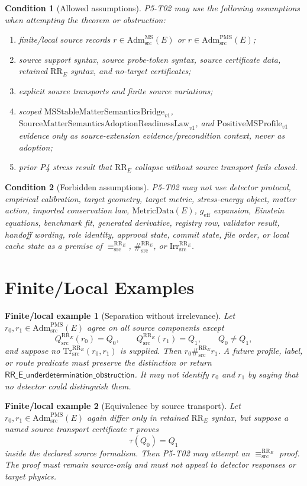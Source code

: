 \documentclass[11pt]{article}
\newcommand{\MSBridge}{\mathrm{MSStableMatterSemanticsBridge}_{v1}}
\newcommand{\SMSAR}{\mathrm{SourceMatterSemanticsAdoptionReadinessLaw}_{v1}}
\newcommand{\PMSProf}{\mathrm{PositiveMSProfile}_{v1}}
\newcommand{\AdmSrc}{\mathrm{Adm}^{\mathrm{MS}}_{\mathrm{src}}}
\newcommand{\AdmPMS}{\mathrm{Adm}^{\mathrm{PMS}}_{\mathrm{src}}}
\newcommand{\RRE}{\mathrm{RR}_E}
\newcommand{\Qsrc}{Q^{\RRE}_{\mathrm{src}}}
\newcommand{\EqRR}{\equiv^{\RRE}_{\mathrm{src}}}
\newcommand{\SepRR}{\#^{\RRE}_{\mathrm{src}}}
\newcommand{\IrrRR}{\mathrm{Irr}^{\RRE}_{\mathrm{src}}}
\newcommand{\TrRR}{\mathrm{Tr}^{\RRE}_{\mathrm{src}}}
\newcommand{\RRUnder}{\mathsf{RR\_E\_underdetermination\_obstruction}}
\newcommand{\MetricData}{\mathrm{MetricData}}
\newcommand{\geff}{g_{\mathrm{eff}}}
\newtheorem{condition}{Condition}
\newtheorem{example}{Finite/local example}
\begin{document}
\begin{condition}[Allowed assumptions]
P5-T02 may use the following assumptions when attempting the theorem or
obstruction:
\begin{enumerate}[label=A\arabic*.,leftmargin=*]
  \item finite/local source records \(r\in\AdmSrc(E)\) or
  \(r\in\AdmPMS(E)\);
  \item source support syntax, source probe-token syntax, source certificate
  data, retained \(\RRE\) syntax, and no-target certificates;
  \item explicit source transports and finite source variations;
  \item scoped \(\MSBridge\), \(\SMSAR\), and \(\PMSProf\) evidence only as
  source-extension evidence/precondition context, never as adoption;
  \item prior P4 stress result that \(\RRE\) collapse without source transport
  fails closed.
\end{enumerate}
\end{condition}

\begin{condition}[Forbidden assumptions]
P5-T02 may not use detector protocol, empirical calibration, target geometry,
target metric, stress-energy object, matter action, imported conservation law,
\(\MetricData(E)\), \(\geff\) expansion, Einstein equations, benchmark fit,
generated derivative, registry row, validator result, handoff wording, role
identity, approval state, commit state, file order, or local cache state as a
premise of \(\EqRR\), \(\SepRR\), or \(\IrrRR\).
\end{condition}

\section{Finite/Local Examples}

\begin{example}[Separation without irrelevance]
Let \(r_0,r_1\in\AdmPMS(E)\) agree on all source components except
\[
  \Qsrc(r_0)=Q_0,\qquad \Qsrc(r_1)=Q_1,\qquad Q_0\ne Q_1,
\]
and suppose no \(\TrRR(r_0,r_1)\) is supplied. Then \(r_0\SepRR r_1\). A
future profile, label, or route predicate must preserve the distinction or
return \(\RRUnder\). It may not identify \(r_0\) and \(r_1\) by saying that no
detector could distinguish them.
\end{example}

\begin{example}[Equivalence by source transport]
Let \(r_0,r_1\in\AdmPMS(E)\) again differ only in retained \(\RRE\) syntax,
but suppose a named source transport certificate \(\tau\) proves
\[
  \tau(Q_0)=Q_1
\]
inside the declared source formalism. Then P5-T02 may attempt an \(\EqRR\)
proof. The proof must remain source-only and must not appeal to detector
responses or target physics.
\end{example}
\end{document}
